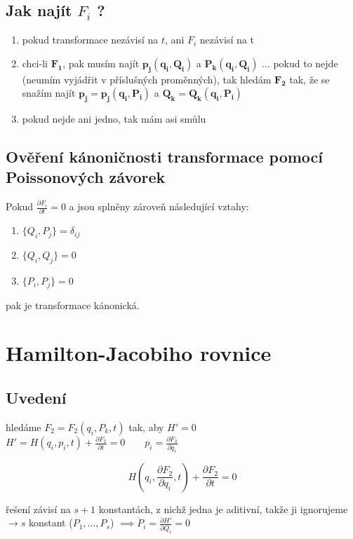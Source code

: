 \documentclass[a5paper,12pt]{article}
\begin{document}
\subsection{Jak najít $F_i$ ?}

\begin{enumerate}
	\item pokud transformace nezávisí na $t$, ani $F_i$ nezávisí na t
	\item chci-li $\boldsymbol{F_1}$, pak musím najít $\boldsymbol{p_j (q_i, Q_i)}$ a $\boldsymbol{P_k (q_i, Q_i)}$ ... pokud to nejde (neumím vyjádřit v příslušných proměnných), tak hledám $\boldsymbol{F_2}$ tak, že se snažím najít $\boldsymbol{p_j = p_j (q_i, P_i)}$ a $\boldsymbol{Q_k = Q_k (q_i, P_i)}$
	\item pokud nejde ani jedno, tak mám asi smůlu
\end{enumerate}

\subsection{Ověření kánoničnosti transformace pomocí Poissonových závorek}
Pokud $\frac{\partial F_i}{\partial t} = 0$ a jsou splněny zároveň následující vztahy:
\begin{enumerate}
	\item $\{Q_i, P_j\} = \delta_{ij}$
	\item $\{Q_i, Q_j\} = 0$
	\item $\{P_i, P_j\} = 0$
\end{enumerate}

\noindent pak je transformace kánonická.

\newpage

\section{Hamilton-Jacobiho rovnice}

\subsection{Uvedení}
hledáme $F_2 = F_2(q_i, P_k, t)$ tak, aby $H' = 0$\\

$H' = H(q_i, p_i, t) + \frac{\partial F_2}{\partial t} = 0 \qquad p_i = \frac{\partial F_2}{\partial q_i}$

\begin{equation*}
\boxed{
	H(q_i, \frac{\partial F_2}{\partial q_i}, t) + \frac{\partial F_2}{\partial t} = 0
}
\end{equation*}

\noindent řešení závisí na $s + 1$ konstantách, z nichž jedna je aditivní, takže ji ignorujeme $\rightarrow s$ konstant ($P_1,...,P_s$) $\implies \dot{P}_i = \frac{\partial H'}{\partial Q_i} = 0$
 
\end{document}
